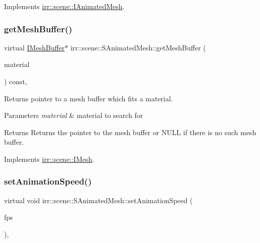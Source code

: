 Implements \hyperlink{classirr_1_1scene_1_1IAnimatedMesh_adccb39fee83bed36a464cf7b96f3a0ca}{irr\+::scene\+::\+I\+Animated\+Mesh}.

\mbox{\label{structirr_1_1scene_1_1SAnimatedMesh_a3c010c881f315e56a05f40632f3c7f79}} 
\subsubsection{\texorpdfstring{get\+Mesh\+Buffer()}{getMeshBuffer()}}
{\footnotesize\ttfamily virtual \hyperlink{classirr_1_1scene_1_1IMeshBuffer}{I\+Mesh\+Buffer}$\ast$ irr\+::scene\+::\+S\+Animated\+Mesh\+::get\+Mesh\+Buffer (\begin{DoxyParamCaption}\item[{const \hyperlink{classirr_1_1video_1_1SMaterial}{video\+::\+S\+Material} \&}]{material }\end{DoxyParamCaption}) const\hspace{0.3cm}{\ttfamily [inline]}, {\ttfamily [virtual]}}



Returns pointer to a mesh buffer which fits a material. 


\begin{DoxyParams}{Parameters}
{\em material} & material to search for \\
\hline
\end{DoxyParams}
\begin{DoxyReturn}{Returns}
Returns the pointer to the mesh buffer or N\+U\+LL if there is no such mesh buffer. 
\end{DoxyReturn}


Implements \hyperlink{classirr_1_1scene_1_1IMesh_a9573dace82efb01ba1f35f9cc28a4ced}{irr\+::scene\+::\+I\+Mesh}.

\mbox{\label{structirr_1_1scene_1_1SAnimatedMesh_ae7a32638fe5c59007d044bbc3c170108}} 
\subsubsection{\texorpdfstring{set\+Animation\+Speed()}{setAnimationSpeed()}}
{\footnotesize\ttfamily virtual void irr\+::scene\+::\+S\+Animated\+Mesh\+::set\+Animation\+Speed (\begin{DoxyParamCaption}\item[{\hyperlink{namespaceirr_a0277be98d67dc26ff93b1a6a1d086b07}{f32}}]{fps }\end{DoxyParamCaption})\hspace{0.3cm}{\ttfamily [inline]}, {\ttfamily [virtual]}}



